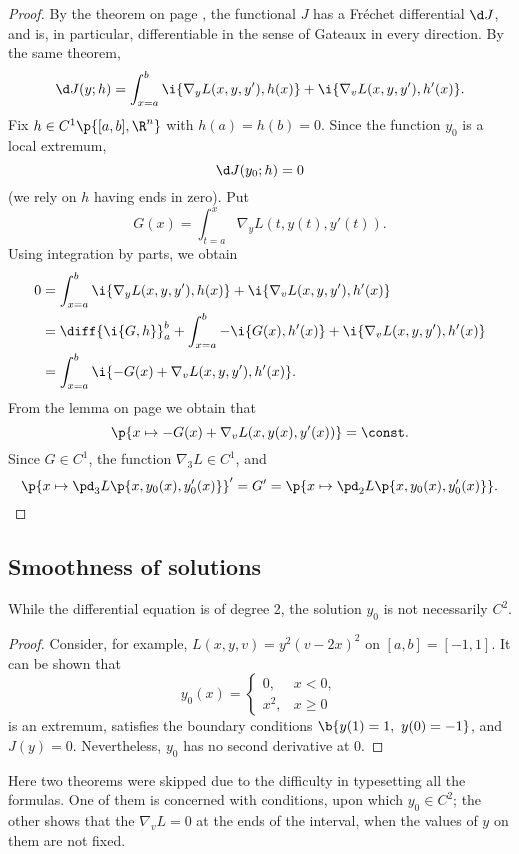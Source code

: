 \begin{proof}
  By the theorem on page \pageref{good functionals are Fréchet differentiable}, the functional $J$ has a Fréchet differential $\d J$, and is, in particular, differentiable in the sense of Gateaux in every direction.
  By the same theorem,
  $$ \d J(y; h) = \int_{x=a}^b \i{\nabla_y L(x, y, y'), h(x)} + \i{\nabla_v L(x, y, y'), h'(x)}. $$
    Fix $h \in C^1\p{[a, b], \R^n}$ with $h(a) = h(b) = 0$.
  Since the function $y_0$ is a local extremum,
  $$ \d J(y_0; h) = 0 $$
  (we rely on $h$ having ends in zero).
  Put
  $$ G(x) = \int_{t=a}^x  \nabla_y L(t, y(t), y'(t)). $$
  Using integration by parts, we obtain
  \begin{align*}
    0
    &=\int_{x=a}^b \i{\nabla_y L(x, y, y'), h(x)} + \i{\nabla_v L(x, y, y'), h'(x)} \\
    &= \diff{\i{G, h}}_a^b + \int_{x=a}^b -\i{G(x), h'(x)} + \i{\nabla_v L(x, y, y'), h'(x)} \\
    &= \int_{x=a}^b \i{-G(x)+\nabla_v L(x, y, y'), h'(x)}.
  \end{align*}
  From the lemma on page \pageref{DR for inner product} we obtain that
  $$ \p{x \mapsto -G(x)+\nabla_v L(x, y(x), y'(x))} = \const. $$
  Since $G \in C^1$, the function $\nabla_3L \in C^1$, and
  $$
  \p{x \mapsto \pd_3 L\p{x, y_0(x), y_0'(x)}}' = G'
  = \p{ x \mapsto \pd_2 L\p{x,y_0(x),y_0'(x)} }. $$
\end{proof}

\subsection{Smoothness of solutions}

\begin{remark}
  While the differential equation is of degree 2, the solution $y_0$ is not necessarily $C^2$.  
\end{remark}

\begin{proof}
  Consider, for example, $L(x, y, v) = y^2(v-2x)^2$ on $[a, b] = [-1, 1]$.
  It can be shown that
  $$ y_0(x) = 
  \begin{cases}
    0, & x < 0, \\
    x^2, & x\ge 0
  \end{cases}
  $$
  is an extremum, satisfies the boundary conditions $\b{y(1) = 1,\ y(0) = -1}$, and $J(y)=0$. Nevertheless, $y_0$ has no second derivative at 0.
\end{proof}

{\footnotesize \wtf Here two theorems were skipped due to the difficulty in typesetting all the formulas. One of them is concerned with conditions, upon which $y_0 \in C^2$; the other shows that the $\nabla_vL = 0$ at the ends of the interval, when the values of $y$ on them are not fixed.}


